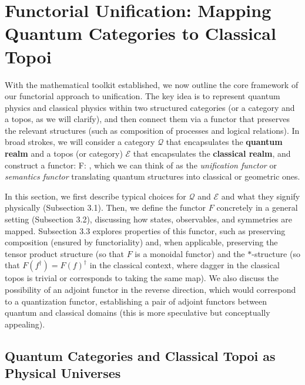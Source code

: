\section{Functorial Unification: Mapping Quantum Categories to Classical Topoi}\label{sec:functorial-mapping}
With the mathematical toolkit established, we now outline the core framework of our functorial approach to unification. The key idea is to represent quantum physics and classical physics within two structured categories (or a category and a topos, as we will clarify), and then connect them via a functor that preserves the relevant structures (such as composition of processes and logical relations). In broad strokes, we will consider a category $\mathcal{Q}$ that encapsulates the \textbf{quantum realm} and a topos (or category) $\mathcal{E}$ that encapsulates the \textbf{classical realm}, and construct a functor:
F:  \to {},
which we can think of as the \emph{unification functor} or \emph{semantics functor} translating quantum structures into classical or geometric ones.

In this section, we first describe typical choices for $\mathcal{Q}$ and $\mathcal{E}$ and what they signify physically (Subsection 3.1). Then, we define the functor $F$ concretely in a general setting (Subsection 3.2), discussing how states, observables, and symmetries are mapped. Subsection 3.3 explores properties of this functor, such as preserving composition (ensured by functoriality) and, when applicable, preserving the tensor product structure (so that $F$ is a monoidal functor) and the $*$-structure (so that $F(f^\dagger) = F(f)^\dagger$ in the classical context, where dagger in the classical topos is trivial or corresponds to taking the same map). We also discuss the possibility of an adjoint functor in the reverse direction, which would correspond to a quantization functor, establishing a pair of adjoint functors between quantum and classical domains (this is more speculative but conceptually appealing).

\subsection{Quantum Categories and Classical Topoi as Physical Universes}
